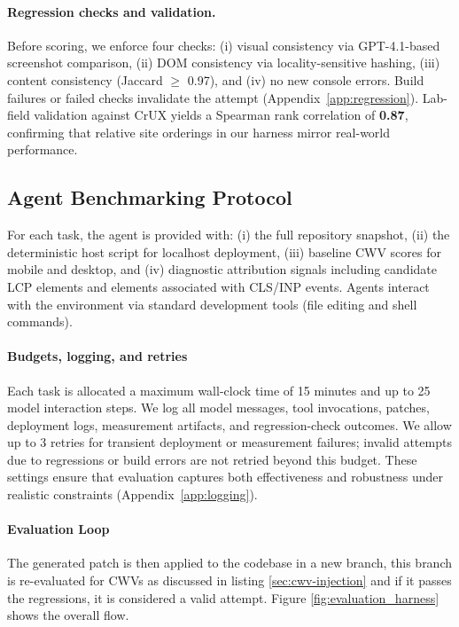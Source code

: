 \paragraph{Regression checks and validation.}
Before scoring, we enforce four checks: (i) visual consistency via GPT-4.1-based screenshot comparison, (ii) DOM consistency via locality-sensitive hashing, (iii) content consistency (Jaccard $\geq$ 0.97), and (iv) no new console errors. Build failures or failed checks invalidate the attempt (Appendix~\ref{app:regression}). Lab-field validation against CrUX yields a Spearman rank correlation of \textbf{0.87}, confirming that relative site orderings in our harness mirror real-world performance.



\subsection{Agent Benchmarking Protocol}
\label{sec:agent_protocol}
For each task, the agent is provided with: (i) the full repository snapshot, (ii) the deterministic host script for localhost deployment, (iii) baseline CWV scores for mobile and desktop, and (iv) diagnostic attribution signals including candidate LCP elements and elements associated with CLS/INP events. Agents interact with the environment via standard development tools (file editing and shell commands).

\paragraph{Budgets, logging, and retries}
Each task is allocated a maximum wall-clock time of 15 minutes and up to 25 model interaction steps. We log all model messages, tool invocations, patches, deployment logs, measurement artifacts, and regression-check outcomes. We allow up to 3 retries for transient deployment or measurement failures; invalid attempts due to regressions or build errors are not retried beyond this budget. These settings ensure that evaluation captures both effectiveness and robustness under realistic constraints (Appendix~\ref{app:logging}).

\paragraph{Evaluation Loop}
\label{sec:eval_loop}
The generated patch is then applied to the codebase in a new branch, this branch is re-evaluated for CWVs as discussed in listing \ref{sec:cwv-injection} and if it passes the regressions, it is considered a valid attempt. Figure \ref{fig:evaluation_harness} shows the overall flow.
